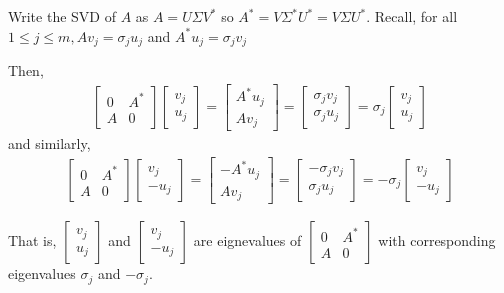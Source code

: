 \documentclass[10pt]{article}
\begin{document}
\begin{solution}[Solution]
Write the SVD of \( A \) as \( A=U\Sigma V^* \) so \( A^* = V\Sigma^*U^* = V\Sigma U^* \). Recall, for all \( 1\leq j\leq m, Av_j = \sigma_ju_j \) and \( A^*u_j=\sigma_jv_j \)

Then,
\begin{align*}
    \left[\begin{array}{cc}0 & A^* \\ A & 0\end{array}\right] \left[\begin{array}{c}v_j \\ u_j\end{array}\right] = \left[\begin{array}{c}A^*u_j \\ Av_j\end{array}\right] = \left[\begin{array}{c}\sigma_jv_j \\ \sigma_j u_j\end{array}\right] = \sigma_j \left[\begin{array}{c}v_j \\ u_j\end{array}\right]
\end{align*}
and similarly,
\begin{align*}
    \left[\begin{array}{cc}0 & A^* \\ A & 0\end{array}\right] \left[\begin{array}{c}v_j \\ -u_j\end{array}\right] = \left[\begin{array}{c}-A^*u_j \\ Av_j\end{array}\right] = \left[\begin{array}{c}-\sigma_jv_j \\ \sigma_j u_j\end{array}\right] = -\sigma_j \left[\begin{array}{c}v_j \\ -u_j\end{array}\right]
\end{align*}

That is, \( \left[\begin{array}{c}v_j\\u_j\end{array}\right] \) and \( \left[\begin{array}{c}v_j\\-u_j\end{array}\right] \) are eignevalues of \( \left[\begin{array}{cc}0 & A^*\\A & 0\end{array}\right] \) with corresponding eigenvalues \( \sigma_j \) and \( -\sigma_j \).


\end{solution}
\end{document}
